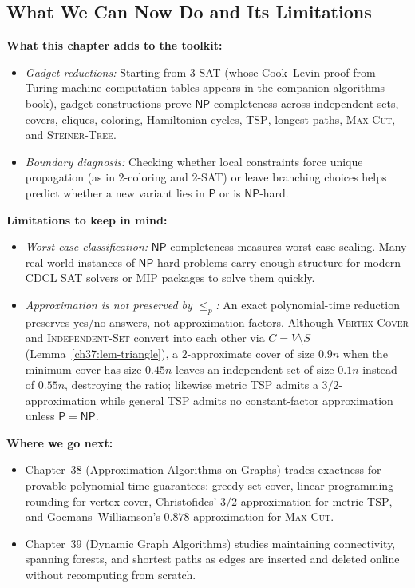 \subsection{What We Can Now Do and Its Limitations}
\begin{connectionbox}
\textbf{What this chapter adds to the toolkit:}
\begin{itemize}
  \item \emph{Gadget reductions:} Starting from \textsc{3-SAT} (whose Cook--Levin proof from Turing-machine computation tables appears in the companion algorithms book), gadget constructions prove $\mathsf{NP}$-completeness across independent sets, covers, cliques, coloring, Hamiltonian cycles, \textsc{TSP}, longest paths, \textsc{Max-Cut}, and \textsc{Steiner-Tree}.
  \item \emph{Boundary diagnosis:} Checking whether local constraints force unique propagation (as in $2$-coloring and \textsc{2-SAT}) or leave branching choices helps predict whether a new variant lies in $\mathsf{P}$ or is $\mathsf{NP}$-hard.
\end{itemize}

\textbf{Limitations to keep in mind:}
\begin{itemize}
  \item \emph{Worst-case classification:} $\mathsf{NP}$-completeness measures worst-case scaling. Many real-world instances of $\mathsf{NP}$-hard problems carry enough structure for modern CDCL SAT solvers or MIP packages to solve them quickly.
  \item \emph{Approximation is not preserved by $\le_p$:} An exact polynomial-time reduction preserves yes/no answers, not approximation factors. Although \textsc{Vertex-Cover} and \textsc{Independent-Set} convert into each other via $C = V\setminus S$ (Lemma~\ref{ch37:lem-triangle}), a $2$-approximate cover of size $0.9n$ when the minimum cover has size $0.45n$ leaves an independent set of size $0.1n$ instead of $0.55n$, destroying the ratio; likewise metric \textsc{TSP} admits a $3/2$-approximation while general \textsc{TSP} admits no constant-factor approximation unless $\mathsf{P}=\mathsf{NP}$.
\end{itemize}

\textbf{Where we go next:}
\begin{itemize}
  \item Chapter~38 (Approximation Algorithms on Graphs) trades exactness for provable polynomial-time guarantees: greedy set cover, linear-programming rounding for vertex cover, Christofides' $3/2$-approximation for metric \textsc{TSP}, and Goemans--Williamson's $0.878$-approximation for \textsc{Max-Cut}.
  \item Chapter~39 (Dynamic Graph Algorithms) studies maintaining connectivity, spanning forests, and shortest paths as edges are inserted and deleted online without recomputing from scratch.
\end{itemize}
\end{connectionbox}

